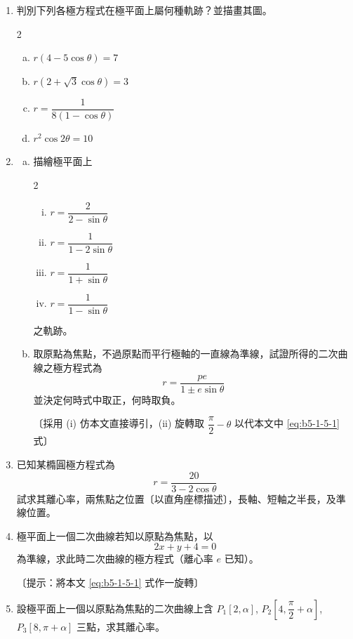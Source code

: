 \begin{enumerate}[1.]
  \item 判別下列各極方程式在極平面上屬何種軌跡？並描畫其圖。
  \begin{multicols}{2}
  \begin{enumerate}[(a)]
    \item $r(4 - 5\cos\theta) = 7$
    \item $r(2 + \sqrt{3}\cos\theta) = 3$
    \item $r = \dfrac{1}{8(1 - \cos\theta)}$
    \item $r^2\cos 2\theta = 10$
  \end{enumerate}
  \end{multicols}

  \item
  \begin{enumerate}[(a)]
    \item 描繪極平面上
    \begin{multicols}{2}
    \begin{enumerate}[(i)]
      \item $r = \dfrac{2}{2 - \sin\theta}$
      \item $r = \dfrac{1}{1 - 2\sin\theta}$
      \item $r = \dfrac{1}{1 + \sin\theta}$
      \item $r = \dfrac{1}{1 - \sin\theta}$
    \end{enumerate}
    \end{multicols}
    之軌跡。
    \item 取原點為焦點，不過原點而平行極軸的一直線為準線，試證所得的二次曲線之極方程式為
    \[
      r = \frac{pe}{1 \pm e\sin\theta}
    \]
    並決定何時式中取正，何時取負。

    〔採用 (i) 仿本文直接導引，(ii) 旋轉取 $\dfrac{\pi}{2} - \theta$ 以代本文中 \eqref{eq:b5-1-5-1} 式〕
  \end{enumerate}

  \item 已知某橢圓極方程式為
  \[
    r = \frac{20}{3 - 2\cos\theta}
  \]
  試求其離心率，兩焦點之位置〔以直角座標描述〕，長軸、短軸之半長，及準線位置。

  \item 極平面上一個二次曲線若知以原點為焦點，以
  \[
    2x + y + 4 = 0
  \]
  為準線，求此時二次曲線的極方程式（離心率 $e$ 已知）。

  〔提示：將本文 \eqref{eq:b5-1-5-1} 式作一旋轉〕

  \item 設極平面上一個以原點為焦點的二次曲線上含 $P_1[2, \alpha]$, $P_2\left[4, \dfrac{\pi}{2} + \alpha\right]$, $P_3[8, \pi + \alpha]$ 三點，求其離心率。


\end{enumerate}
